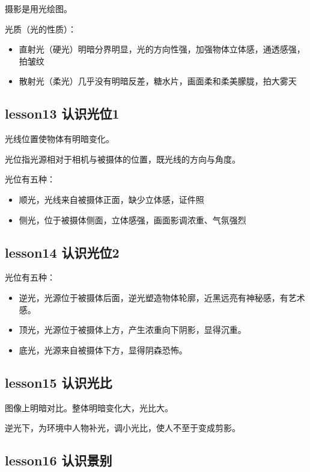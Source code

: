 \documentclass{book}
\begin{document}
摄影是用光绘图。

光质（光的性质）：\begin{itemize}
           \item 直射光（硬光）明暗分界明显，光的方向性强，加强物体立体感，通透感强，拍皱纹
           \item 散射光（柔光）几乎没有明暗反差，糖水片，画面柔和柔美朦胧，拍大雾天
         \end{itemize}

\subsection{lesson13 认识光位1}

光线位置使物体有明暗变化。

光位指光源相对于相机与被摄体的位置，既光线的方向与角度。

光位有五种：\begin{itemize}
        \item 顺光，光线来自被摄体正面，缺少立体感，证件照
        \item 侧光，位于被摄体侧面，立体感强，画面影调浓重、气氛强烈
      \end{itemize}

\subsection{lesson14 认识光位2}

光位有五种：\begin{itemize}
        \item 逆光，光源位于被摄体后面，逆光塑造物体轮廓，近黑远亮有神秘感，有艺术感。
        \item 顶光，光源位于被摄体上方，产生浓重向下阴影，显得沉重。
        \item 底光，光源来自被摄体下方，显得阴森恐怖。
      \end{itemize}

\subsection{lesson15 认识光比}

图像上明暗对比。整体明暗变化大，光比大。

逆光下，为环境中人物补光，调小光比，使人不至于变成剪影。

\subsection{lesson16 认识景别}
\end{document}
